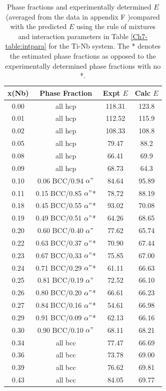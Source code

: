 \newpage
\begin{table}[H]
	\caption{Phase fractions and experimentally determined $E$ (averaged from the data in appendix F \cite{Friak2012,Timoshevskii2011,Friak2012,Karre2015})compared with the predicted $E$ using the rule of mixtures and interaction parameters in Table \ref{Ch7-table:intpara} for the Ti-Nb system. The * denotes the estimated phase fractions as opposed to the experimentally determined phase fractions with no *.}
	\centering
	\begin{tabular}{ c c c c}
		\hline
		x(Nb) & Phase Fraction & Expt $E$ & Calc $E$\\
		\hline
		0.00 & all hcp & 118.31 & 123.8\\
		0.01 & all hcp & 112.52 & 115.9\\
		0.02 & all hcp & 108.33 & 108.8\\
		0.05 & all hcp & 79.47 & 88.2\\
		0.08 & all hcp & 66.41 & 69.9\\
		0.09 & all hcp & 68.73 & 64.3\\
		0.10 & 0.06 BCC/0.94 $\alpha"$ & 84.64 & 95.89\\
		0.11 & 0.15 BCC/0.85 $\alpha"$* & 78.72 & 88.19\\
		0.18 & 0.45 BCC/0.55 $\alpha"$* & 93.02 & 70.08\\
		0.19 & 0.49 BCC/0.51 $\alpha"$* & 64.26 & 68.65\\
		0.20 & 0.60 BCC/0.40 $\alpha"$ & 77.62 & 65.74\\
		0.22 & 0.63 BCC/0.37 $\alpha"$* & 70.90 & 67.44\\
		0.23 & 0.67 BCC/0.33 $\alpha"$* & 75.85 & 67.00\\
		0.24 & 0.71 BCC/0.29 $\alpha"$* & 61.11 & 66.63\\
		0.25 & 0.81 BCC/0.19 $\alpha"$ & 72.52 & 66.10\\
		0.26 & 0.80 BCC/0.20 $\alpha"$* & 66.61 & 66.23\\
		0.27 & 0.84 BCC/0.16 $\alpha"$* & 54.61 & 66.98\\
		0.29 & 0.91 BCC/0.09 $\alpha"$* & 62.13 & 66.16\\
		0.30 & 0.90 BCC/0.10 $\alpha"$ & 68.11 & 68.21\\
		0.34 & all bcc & 77.47 & 66.69\\
		0.36 & all bcc & 73.78 & 69.00\\
		0.39 & all bcc & 76.62 & 69.81\\
		0.43 & all bcc & 84.05 & 69.77\\
		\hline
	\end{tabular}
	\label{Ch7-table:elasexptdata}
\end{table}
\clearpage

